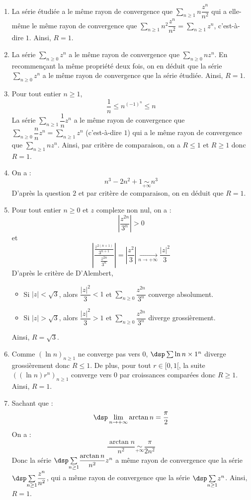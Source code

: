 \documentclass[a4paper,10pt]{report}
\newcommand{\Sum}[2]{\ensuremath{\textstyle{\sum\limits_{#1}^{#2}}}}
\begin{document}
\begin{enumerate}
\item La série étudiée a le même rayon de convergence que $\Sum{n \geq 1}{} n \dfrac{z^n}{n^2}$ qui a elle-même le même rayon de convergence que $\Sum{n \geq 1}{} n^2 \dfrac{z^n}{n^2} = \Sum{n \geq 1}{} z^n$, c'est-à-dire $1$. Ainsi, $R=1$.
\item La série $\Sum{n \geq 0}{} z^n$ a le même rayon de convergence que $\Sum{n \geq 0}{} n z^n$. En recommençant la même propriété deux fois, on en déduit que la série $\Sum{n \geq 0}{} z^n$ a le même rayon de convergence que la série étudiée. Ainsi, $R=1$.
\item Pour tout entier $n \geq 1$,
$$ \dfrac{1}{n} \leq n^{(-1)^n} \leq n$$
La série $\Sum{n \geq 1}{} \dfrac{1}{n} z^n$ a le même rayon de convergence que $\Sum{n \geq 0}{} \dfrac{n}{n} z^n = \Sum{n \geq 1}{}  z^n$ (c'est-à-dire $1$) qui a le même rayon de convergence que $\Sum{n \geq 1}{} n z^n$. Ainsi, par critère de comparaison, on a $R \leq 1$ et $R \geq 1$ donc $R=1$.
\item On a :
$$ n^3-2n^2+1 \underset{+ \infty}{\sim} n^3$$
D'après la question $2$ et par critère de comparaison, on en déduit que $R=1$.
\item Pour tout entier $n \geq 0$ et $z$ complexe non nul, on a :
$$ \left\vert \frac{z^{2n}}{3^n} \right\vert >0$$
et 
$$ \left\vert\dfrac{\frac{z^{2(n+1)}}{3^{n+1}}}{\frac{z^{2n}}{3^n}}\right\vert=\left\vert\dfrac{z^2}{3}\right\vert\underset{n\to +\infty}{\longrightarrow}\dfrac{\vert z\vert^2}{3}$$
D'après le critère de D'Alembert,
\begin{itemize}
\item Si $\vert z\vert<\sqrt{3}$, alors $\dfrac{\vert z\vert^2}{3}<1$ et $\Sum{n \geq 0}{}\dfrac{z^{2n}}{3^n}$ converge absolument. 
\item Si $\vert z\vert>\sqrt{3}$, alors $\dfrac{\vert z\vert^2}{3}>1$ et $\Sum{n \geq 0}{} \dfrac{z^{2n}}{3^n}$ diverge grossièrement. 
\end{itemize}
Ainsi, $R=\sqrt{3}$.
\item Comme $(\ln n)_{n\geq 1}$ ne converge pas vers $0$, $\dsp\sum \ln n \times 1^n$ diverge grossièrement donc $R\leq 1$. De plus, pour tout $r \in [0,1[$, la suite $((\ln n)r^n)_{n\geq 1}$ converge vers $0$ par croissances comparées donc $R\geq 1$. Ainsi, $R=1$.
\item Sachant que :
$$\dsp\lim_{n\to +\infty}\arctan n=\dfrac{\pi}{2}$$
On a :
\[
\dfrac{\arctan n}{n^2} \underset{ +\infty}{\sim}\dfrac{\pi}{2n^2}
\]
Donc la série $\dsp\Sum{n \geq 1}{} \dfrac{\arctan n}{n^2}z^n$ a même rayon de convergence que la série $\dsp\Sum{n \geq 1}{}  \dfrac{z^n}{n^2}$, qui a même rayon de convergence que la série $\dsp\Sum{n \geq 1}{}  z^n$. Ainsi, $R=1$.

\end{enumerate}
\end{document}
